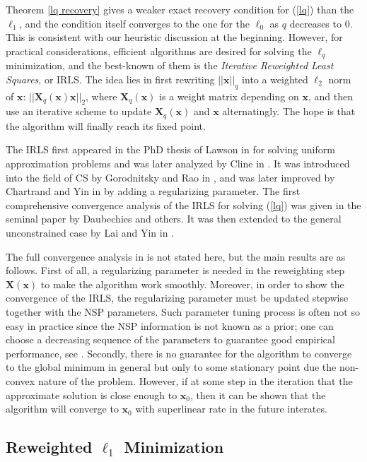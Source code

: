 \documentclass[11pt]{article}
\numberwithin{equation}{section}
\theoremstyle{plain}
\theoremstyle{definition}
\def\x{{\mathbf x}}
\begin{document}
Theorem \ref{lq recovery} gives a weaker exact recovery condition for (\ref{lq}) than the $\ell_1$, and the condition itself converges to the one for the $\ell_0$ as $q$ decreases to $0$. This is consistent with our heuristic discussion at the beginning. However, for practical considerations, efficient algorithms are desired for solving the $\ell_q$ minimization, and the best-known of them is the \emph{Iterative Reweighted Least Squares}, or IRLS. The idea lies in first rewriting $||\x||_q$ into a weighted $\ell_2$ norm of $\x$: $||\mathbf{X}_q(\x)\x||_2$, where $\mathbf{X}_q(\x)$ is a weight matrix depending on $\x$, and then use an iterative scheme to update $\mathbf{X}_q(\x)$ and $\x$ alternatingly. The hope is that the algorithm will finally reach its fixed point.    

The IRLS first appeared in the PhD thesis of Lawson in \cite{lawson1961contribution} for solving uniform approximation problems and was later analyzed by Cline in \cite{cline1972rate}. It was introduced into the field of CS by Gorodnitsky and Rao in \cite{gorodnitsky1997sparse}, and was later improved by Chartrand and Yin in \cite{chartrand2008iteratively} by adding a regularizing parameter. The first comprehensive convergence analysis of the IRLS for solving (\ref{lq}) was given in the seminal paper \cite{daubechies2010iteratively} by  Daubechies and others. It was then extended to the general unconstrained case by Lai and Yin in \cite{lai2013improved}. 

The full convergence analysis in \cite{daubechies2010iteratively} is not stated here, but the main results are as follows. First of all, a regularizing parameter is needed in the reweighting step $\mathbf{X}(\x)$ to make the algorithm work smoothly. Moreover, in order to show the convergence of the IRLS, the regularizing parameter must be updated stepwise together with the NSP parameters. Such parameter tuning process is often not so easy in practice since the NSP information is not known as a prior; one can choose a decreasing sequence of the parameters to guarantee good empirical performance, see \cite{foucart2009sparsest}. Secondly, there is no guarantee for the algorithm to converge to the global minimum in general but only to some stationary point due the non-convex nature of the problem. However, if at some step in the iteration that the approximate solution is close enough to $\x_0$, then it can be shown that the algorithm will converge to $\x_0$ with superlinear rate in the future interates.      

\subsection{Reweighted $\ell_1$ Minimization}
\end{document}
